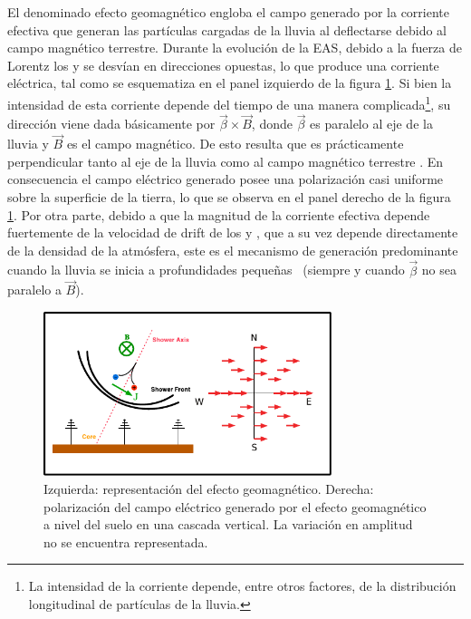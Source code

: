 	El denominado efecto geomagn\'etico engloba el campo generado por la corriente efectiva que generan las part\'iculas cargadas de la lluvia al deflectarse debido al campo magn\'etico terrestre.
	Durante la evoluci\'on de la EAS, debido a la fuerza de Lorentz los \el{+} y \el{-} se desv\'ian en direcciones opuestas, lo que produce una corriente el\'ectrica, tal como se esquematiza en el panel izquierdo de la figura \ref{fig:geom_sketch}.
	Si bien la intensidad de esta corriente depende del tiempo de una manera complicada\footnote{La intensidad de la corriente depende, entre otros factores, de la distribuci\'on longitudinal de part\'iculas de la lluvia.}, su direcci\'on viene dada b\'asicamente por $\vec\beta\times \vec B$, donde $\vec \beta$ es paralelo al eje de la lluvia y $\vec B$ es el campo magn\'etico. 
	De esto resulta que es pr\'acticamente perpendicular tanto al eje de la lluvia como al campo magn\'etico terrestre \cite{kahn:1966}.
	En consecuencia el campo el\'ectrico generado posee una polarizaci\'on casi uniforme sobre la superficie de la tierra, lo que se observa en el panel derecho de la figura \ref{fig:geom_sketch}.
	Por otra parte, debido a que la magnitud de la corriente efectiva depende fuertemente de la velocidad de drift de los \el{+} y \el{-}, que a su vez depende directamente de la densidad de la atm\'osfera, este es el mecanismo de generaci\'on predominante cuando la lluvia se inicia a profundidades peque\~nas~\cite{requiered} (siempre y cuando $\vec\beta$ no sea paralelo a $\vec B$).
	\begin{figure}[ht!]
		\centering
		\includegraphics[width=0.75\textwidth]{fig/EASRadio/geom_sketch}
		\caption{\label{fig:geom_sketch} Izquierda: representaci\'on del efecto geomagn\'etico. Derecha: polarizaci\'on del campo el\'ectrico generado por el efecto geomagn\'etico a nivel del suelo en una cascada vertical. La variaci\'on en amplitud no se encuentra representada.}
	\end{figure}
	
